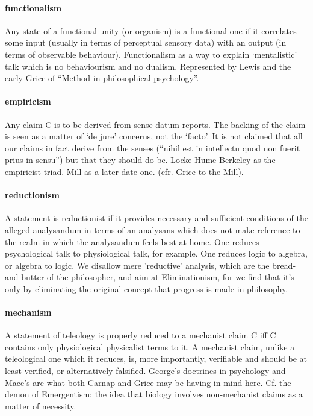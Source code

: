 \documentclass[10pt,titlepage]{book}
\begin{document}
\paragraph{functionalism} Any state of a functional unity (or organism) is a  
functional one if it correlates some input (usually in terms of perceptual  sensory 
data) with an output (in terms of observable behaviour). Functionalism  as a 
way to explain `mentalistic' talk which is no behaviourism and no dualism.  
Represented by Lewis and the early Grice of ``Method in philosophical  
psychology''. 
 
\paragraph{empiricism} Any claim C is to be derived from sense-datum reports. The  
backing of the claim is seen as a matter of `de jure' concerns, not the 
`facto'.  It is not claimed that all our claims in fact derive from the senses 
(``nihil est in intellectu quod non fuerit prius in sensu'') but that they 
should do be. Locke-Hume-Berkeley as the empiricist triad. Mill as a later date 
one. (cfr.  Grice to the Mill).
 
\paragraph{reductionism} A statement is reductionist if it provides necessary and  
sufficient conditions of the alleged analysandum in terms of an analysans which 
 does not make reference to the realm in which the analysandum feels best at 
home.  One reduces psychological talk to physiological talk, for example. 
One reduces  logic to algebra, or algebra to logic. We disallow mere 
'reductive' analysis,  which are the bread-and-butter of the philosopher, and aim at 
Eliminationism,  for we find that it's only by eliminating the original 
concept that progress is  made in philosophy.
 
\paragraph{mechanism} A statement of teleology is properly reduced to a mechanist  
claim C iff C contains only physiological physicalist terms to it. A mechanist  
claim, unlike a teleological one which it reduces, is, more importantly,  
verifiable and should be at least verified, or alternatively falsified. 
George's  doctrines in psychology and Mace's are what both Carnap and Grice may 
be having  in mind here. Cf. the demon of Emergentism: the idea that biology 
involves  non-mechanist claims as a matter of necessity.
 
\end{document}
